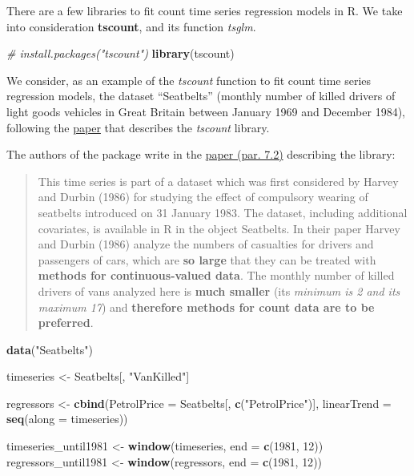 \documentclass[
]{article}
\newenvironment{Shaded}{\begin{snugshade}}{\end{snugshade}}
\newcommand{\CommentTok}[1]{\textcolor[rgb]{0.56,0.35,0.01}{\textit{#1}}}
\newcommand{\DataTypeTok}[1]{\textcolor[rgb]{0.13,0.29,0.53}{#1}}
\newcommand{\DecValTok}[1]{\textcolor[rgb]{0.00,0.00,0.81}{#1}}
\newcommand{\KeywordTok}[1]{\textcolor[rgb]{0.13,0.29,0.53}{\textbf{#1}}}
\newcommand{\NormalTok}[1]{#1}
\newcommand{\StringTok}[1]{\textcolor[rgb]{0.31,0.60,0.02}{#1}}
\begin{document}
There are a few libraries to fit count time series regression models in R. We take into consideration \textbf{tscount}, and its function \emph{tsglm}.

\begin{Shaded}
\begin{Highlighting}[]
\CommentTok{# install.packages("tscount")}
\KeywordTok{library}\NormalTok{(tscount)}
\end{Highlighting}
\end{Shaded}

We consider, as an example of the \emph{tscount} function to fit count time series regression models, the dataset ``Seatbelts'' (monthly number of killed drivers of light goods vehicles in Great Britain between January 1969 and December 1984), following the \href{https://cran.r-project.org/web/packages/tscount/vignettes/tsglm.pdf}{paper} that describes the \emph{tscount} library.

The authors of the package write in the \href{https://cran.r-project.org/web/packages/tscount/vignettes/tsglm.pdf}{paper (par. 7.2)} describing the library:

\begin{quote}
This time series is part of a dataset which was first considered by Harvey and Durbin (1986) for studying the effect of compulsory wearing of seatbelts introduced on 31 January 1983. The dataset, including additional covariates, is available in R in the object Seatbelts. In their paper Harvey and Durbin (1986) analyze the numbers of casualties for drivers and passengers of cars, which are \textbf{so large} that they can be treated with \textbf{methods for continuous-valued data}. The monthly number of killed drivers of vans analyzed here is \textbf{much smaller} (its \emph{minimum is 2 and its maximum 17}) and \textbf{therefore methods for count data are to be preferred}.
\end{quote}

\begin{Shaded}
\begin{Highlighting}[]
\KeywordTok{data}\NormalTok{(}\StringTok{"Seatbelts"}\NormalTok{)}

\NormalTok{timeseries <-}\StringTok{ }\NormalTok{Seatbelts[, }\StringTok{"VanKilled"}\NormalTok{]}

\NormalTok{regressors <-}\StringTok{ }\KeywordTok{cbind}\NormalTok{(}\DataTypeTok{PetrolPrice =}\NormalTok{ Seatbelts[, }\KeywordTok{c}\NormalTok{(}\StringTok{"PetrolPrice"}\NormalTok{)], }
                    \DataTypeTok{linearTrend =} \KeywordTok{seq}\NormalTok{(}\DataTypeTok{along =}\NormalTok{ timeseries))}

\NormalTok{timeseries_until1981 <-}\StringTok{ }\KeywordTok{window}\NormalTok{(timeseries, }\DataTypeTok{end =} \KeywordTok{c}\NormalTok{(}\DecValTok{1981}\NormalTok{, }\DecValTok{12}\NormalTok{))}
\NormalTok{regressors_until1981 <-}\StringTok{ }\KeywordTok{window}\NormalTok{(regressors, }\DataTypeTok{end =} \KeywordTok{c}\NormalTok{(}\DecValTok{1981}\NormalTok{, }\DecValTok{12}\NormalTok{))}
\end{Highlighting}
\end{Shaded}
\end{document}
